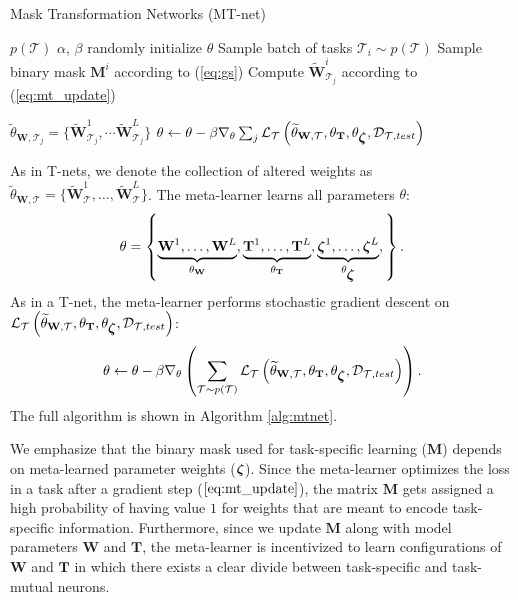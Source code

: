 \documentclass{article}
\newcommand{\calD}{{\mathcal{D}}}
\newcommand{\calT}{{\mathcal{T}}}
\newcommand{\bzeta}{\mbox{\boldmath $\zeta$}}
\newcommand{\0}{{\bf 0}}
\newcommand{\be}{\begin{eqnarray}}
\newcommand{\ee}{\end{eqnarray}}
\newcommand{\W}{\mathbf{W}}
\newcommand{\T}{\mathbf{T}}
\newcommand{\M}{\mathbf{M}}
\newcommand{\logit}{\bzeta}
\newcommand{\loss}{\mathcal{L}_{\calT}}
\newcommand{\mask}{\M}
\begin{document}
\begin{algorithm}[t]
\caption{Mask Transformation Networks (MT-net)}
\label{alg:mtnet}
\begin{algorithmic}[1]
\REQUIRE $p(\mathcal{T})$
\REQUIRE $\alpha$, $\beta$
\STATE randomly initialize $\theta$
    \STATE Sample batch of tasks $ \mathcal{T}_i \sim p(\mathcal{T})$ 
        	\STATE Sample binary mask $\mask^i$ according to (\ref{eq:gs})
\STATE Compute $\widetilde{\W}^{i}_{\calT_j}$ according to (\ref{eq:mt_update})

        \ENDFOR
        \STATE $\widetilde{\theta}_{\W, \calT_j} = \{ \widetilde{\W}^{1}_{\calT_j}, \cdots \widetilde{\W}^{L}_{\calT_j} \}$
    \ENDFOR
    \STATE $\theta \leftarrow \theta - \beta \nabla_{\theta} \sum_{j} \loss \left(\widetilde{\theta}_{\W,\calT}, \theta_{\T},\theta_{\logit},\calD_{\calT,test} \right)$
\ENDWHILE
\end{algorithmic}
\end{algorithm}

 As in T-nets, we denote the collection of altered weights as $\widetilde{\theta}_{\W,\calT} = \{ \widetilde{\W}^1_{\calT}, \ldots, \widetilde{\W}^L_{\calT} \}$.
The meta-learner learns all parameters $\theta$:
\be
\theta =\left\{ 
\underbrace{\W^1, \ldots, \W^L}_{\theta_{\W}}, 
\underbrace{\T^1, \ldots, \T^L}_{\theta_{\T}},
\underbrace{\logit^1, \ldots, \logit^L}_{\theta_{\logit}},
  \right\}.
\ee
As in a T-net, the meta-learner performs stochastic gradient descent on $\loss \left(\widetilde{\theta}_{\W,\calT}, \theta_{\T},\theta_{\logit},\calD_{\calT,test} \right)$:
\be
\label{eq:theta}
\theta  \leftarrow \theta - \beta \nabla_{\theta}
 \left( \sum_{\calT \sim p(\calT)} \loss \left(\widetilde{\theta}_{\W,\calT}, \theta_{\T},\theta_{\logit},\calD_{\calT,test} \right) \right).
\ee
The full algorithm is shown in Algorithm \ref{alg:mtnet}.

We emphasize that the binary mask used for task-specific learning ($\mask$) depends on meta-learned parameter weights ($\logit$).
Since the meta-learner optimizes the loss in a task after a gradient step ($\ref{eq:mt_update}$), the matrix $\mask$ gets assigned a high probability of
having value $1$ for weights that are meant to encode task-specific information.
Furthermore, since we update $\mask$ along with model parameters $\W$ and $\T$, the meta-learner is incentivized to
learn configurations of $\W$ and $\T$ in which there exists a clear divide between task-specific and task-mutual neurons.
\end{document}
